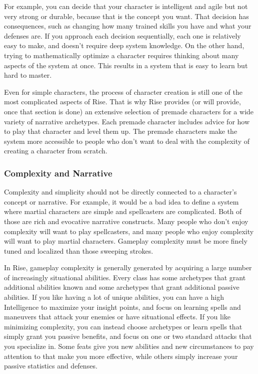       For example, you can decide that your character is intelligent and agile but not very strong or durable, because that is the concept you want.
      That decision has consequences, such as changing how many trained skills you have and what your defenses are.
      If you approach each decision sequentially, each one is relatively easy to make, and doesn't require deep system knowledge.
      On the other hand, trying to mathematically optimize a character requires thinking about many aspects of the system at once.
      This results in a system that is easy to learn but hard to master.

      Even for simple characters, the process of character creation is still one of the most complicated aspects of Rise.
      That is why Rise provides (or will provide, once that section is done) an extensive selection of premade characters for a wide variety of narrative archetypes.
      Each premade character includes advice for how to play that character and level them up.
      The premade characters make the system more accessible to people who don't want to deal with the complexity of creating a character from scratch.

    \subsubsection{Complexity and Narrative}
      Complexity and simplicity should not be directly connected to a character's concept or narrative.
      For example, it would be a bad idea to define a system where martial characters are simple and spellcasters are complicated.
      Both of those are rich and evocative narrative constructs.
      Many people who don't enjoy complexity will want to play spellcasters, and many people who enjoy complexity will want to play martial characters.
      Gameplay complexity must be more finely tuned and localized than those sweeping strokes.

      In Rise, gameplay complexity is generally generated by acquiring a large number of increasingly situational abilities.
      Every class has some archetypes that grant additional abilities known and some archetypes that grant additional passive abilities.
      If you like having a lot of unique abilities, you can have a high Intelligence to maximize your insight points, and focus on learning spells and maneuvers that attack your enemies or have situational effects.
      If you like minimizing complexity, you can instead choose archetypes or learn spells that simply grant you passive benefits, and focus on one or two standard attacks that you specialize in.
      Some feats give you new abilities and new circumstances to pay attention to that make you more effective, while others simply increase your passive statistics and defenses.

